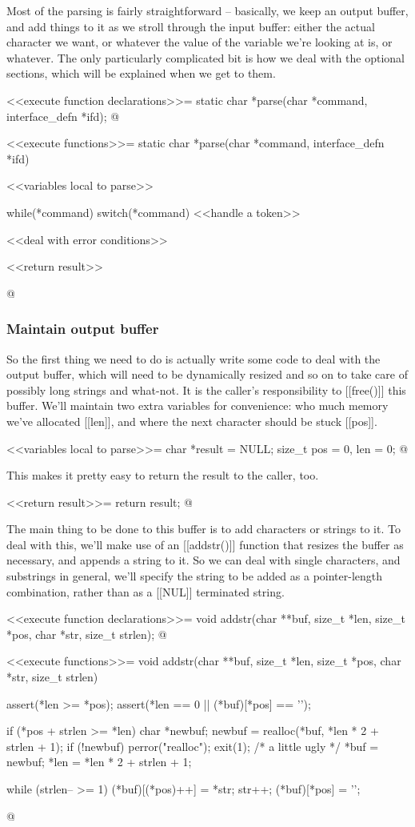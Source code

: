\documentclass{article}
\begin{document}
Most of the parsing is fairly straightforward -- basically, we keep an
output buffer, and add things to it as we stroll through the input
buffer: either the actual character we want, or whatever the value of
the variable we're looking at is, or whatever. The only particularly
complicated bit is how we deal with the optional sections, which will
be explained when we get to them.

<<execute function declarations>>=
static char *parse(char *command, interface_defn *ifd);
@ 

<<execute functions>>=
static char *parse(char *command, interface_defn *ifd) {
	<<variables local to parse>>

	while(*command) {
		switch(*command) {
			<<handle a token>>
		}
	}

	<<deal with error conditions>>

	<<return result>>
}
@

\subsubsection{Maintain output buffer}

So the first thing we need to do is actually write some code to deal
with the output buffer, which will need to be dynamically resized and
so on to take care of possibly long strings and what-not. It is the
caller's responsibility to [[free()]] this buffer. We'll maintain two
extra variables for convenience: who much memory we've allocated
[[len]], and where the next character should be stuck [[pos]].

<<variables local to parse>>=
char *result = NULL;
size_t pos = 0, len = 0;
@ 

This makes it pretty easy to return the result to the caller, too.

<<return result>>=
return result;
@

The main thing to be done to this buffer is to add characters or
strings to it. To deal with this, we'll make use of an [[addstr()]]
function that resizes the buffer as necessary, and appends a string to
it. So we can deal with single characters, and substrings in general,
we'll specify the string to be added as a pointer-length combination,
rather than as a [[NUL]] terminated string.

<<execute function declarations>>=
void addstr(char **buf, size_t *len, size_t *pos, char *str, size_t strlen);
@ 

<<execute functions>>=
void addstr(char **buf, size_t *len, size_t *pos, char *str, size_t strlen) {
	assert(*len >= *pos);
	assert(*len == 0 || (*buf)[*pos] == '\0');

	if (*pos + strlen >= *len) {
		char *newbuf;
		newbuf = realloc(*buf, *len * 2 + strlen + 1);
		if (!newbuf) {
			perror("realloc");
			exit(1); /* a little ugly */
		}
		*buf = newbuf;
		*len = *len * 2 + strlen + 1;
	}

	while (strlen-- >= 1) {
		(*buf)[(*pos)++] = *str;
		str++;
	}
	(*buf)[*pos] = '\0';
}
@ 
\end{document}
